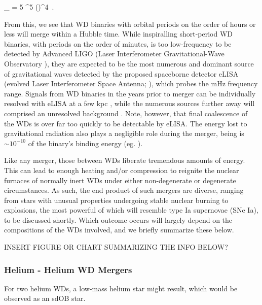 \eqbegin
\tau_{} = 5 ^5 \left(\right)^4 \frac{\Msun}{\Ma} \frac{\Msun}{\Md} \frac{\Msun}{\Mtot}\,.
\label{eq:c1_gravtimescale}
\eqend

\noindent From this, we see that WD binaries with orbital periods on the order of hours or less will merge within a Hubble time.  While inspiralling short-period WD binaries, with periods on the order of minutes, is too low-frequency to be detected by Advanced LIGO (Laser Interferometer Gravitational-Wave Observatory \citealt{ligo+15}), they are expected to be the most numerous and dominant source of gravitational waves \citep{mars11} detected by the proposed spaceborne detector eLISA (evolved Laser Interferometer Space Antenna; \citealt{amar+13}), which probes the mHz frequency range.  Signals from WD binaries in the years prior to merger can be individually resolved with eLISA at a few kpc \citep{loreig09, dan+11}, while the numerous sources further away will comprised an unresolved background \cite{neleyp01,amar+13}.  Note, however, that final coalescence of the WDs is over far too quickly to be detectable by eLISA.  The energy lost to gravitational radiation also plays a negligible role during the merger, being is $\sim10^{-10}$ of the binary's binding energy (eg. \citealt{loreig09}).

Like any merger, those between WDs liberate tremendous amounts of energy.  This can lead to enough heating and/or compression to reignite the nuclear furnaces of normally inert WDs under either non-degenerate or degenerate circumstances.  As such, the end product of such mergers are diverse, ranging from stars with unusual properties undergoing stable nuclear burning to explosions, the most powerful of which will resemble type Ia supernovae (SNe Ia), to be discussed shortly.  Which outcome occurs will largely depend on the compositions of the WDs involved, and we briefly summarize these below.

{\charles INSERT FIGURE OR CHART SUMMARIZING THE INFO BELOW?}

\subsubsection{Helium - Helium WD Mergers}



For two helium WDs, a low-mass helium star might result, which would be observed as an sdOB star.  

